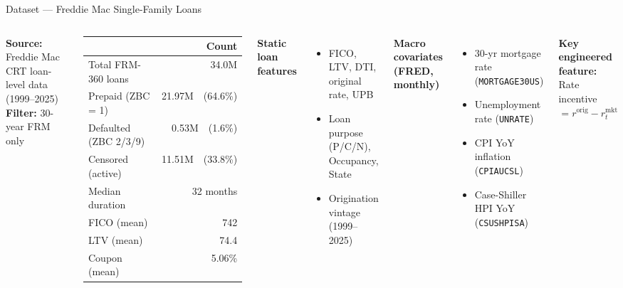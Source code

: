 \documentclass[aspectratio=169]{beamer}
\begin{document}
\begin{frame}{Dataset — Freddie Mac Single-Family Loans}
  \begin{columns}
      \textbf{Source:} Freddie Mac CRT loan-level data (1999–2025)\\[0.4em]
      \textbf{Filter:} 30-year FRM only
      \begin{table}
        \small
        \begin{tabular}{lr}
          \toprule
          \textbf{} & \textbf{Count} \\
          \midrule
          Total FRM-360 loans & 34.0M \\
          Prepaid (ZBC = 1)   & 21.97M~~(64.6\%) \\
          Defaulted (ZBC 2/3/9) & 0.53M~~(1.6\%) \\
          Censored (active)   & 11.51M~~(33.8\%) \\
          \midrule
          Median duration     & 32 months \\
          FICO (mean)         & 742 \\
          LTV (mean)          & 74.4 \\
          Coupon (mean)       & 5.06\% \\
          \bottomrule
        \end{tabular}
      \end{table}
      \textbf{Static loan features}
      \begin{itemize}\small
        \item FICO, LTV, DTI, original rate, UPB
        \item Loan purpose (P/C/N), Occupancy, State
        \item Origination vintage (1999–2025)
      \end{itemize}
      \vspace{0.3em}
      \textbf{Macro covariates (FRED, monthly)}
      \begin{itemize}\small
        \item 30-yr mortgage rate (\texttt{MORTGAGE30US})
        \item Unemployment rate (\texttt{UNRATE})
        \item CPI YoY inflation (\texttt{CPIAUCSL})
        \item Case-Shiller HPI YoY (\texttt{CSUSHPISA})
      \end{itemize}
      \vspace{0.3em}
      \textbf{Key engineered feature:}\\
      Rate incentive $= r^{\text{orig}} - r^{\text{mkt}}_t$
  \end{columns}
\end{frame}
\end{document}
